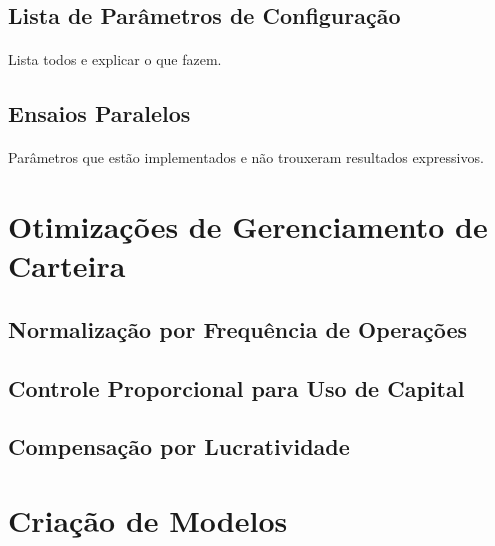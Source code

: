 \subsection{Lista de Parâmetros de Configuração}
\paragraph{} Lista todos e explicar o que fazem.

\subsection{Ensaios Paralelos}
\paragraph{} Parâmetros que estão implementados e não trouxeram resultados expressivos.



\section{Otimizações de Gerenciamento de Carteira}

\subsection{Normalização por Frequência de Operações}
\paragraph{}

\subsection{Controle Proporcional para Uso de Capital}
\paragraph{}

\subsection{Compensação por Lucratividade}
\paragraph{}



\section{Criação de Modelos}

